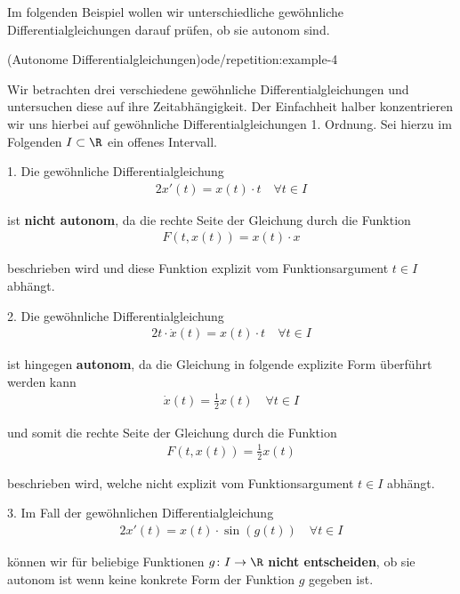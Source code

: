 \documentclass[letterpaper,10pt,english]{jupyterBook}
\begin{document}
\par
Im folgenden Beispiel wollen wir unterschiedliche gewöhnliche Differentialgleichungen darauf prüfen, ob sie autonom sind.
\begin{example}{(Autonome Differentialgleichungen)}{ode/repetition:example-4}



\par
Wir betrachten drei verschiedene gewöhnliche Differentialgleichungen und untersuchen diese auf ihre Zeitabhängigkeit.
Der Einfachheit halber konzentrieren wir uns hierbei auf gewöhnliche Differentialgleichungen 1. Ordnung.
Sei hierzu  im Folgenden \(I \subset \R\) ein offenes Intervall.

\par
1. Die gewöhnliche Differentialgleichung
\begin{align*}
2x'(t) = x(t)\cdot t \quad \forall t \in I
\end{align*}
\par
ist \textbf{nicht autonom}, da die rechte Seite der Gleichung durch die Funktion
\begin{align*}
F(t,x(t)) = x(t) \cdot x
\end{align*}
\par
beschrieben wird und diese Funktion explizit vom Funktionsargument \(t \in I\) abhängt.



\par
2. Die gewöhnliche Differentialgleichung
\begin{align*}
2t\cdot \dot{x}(t) = x(t)\cdot t \quad \forall t \in I
\end{align*}
\par
ist hingegen \textbf{autonom}, da die Gleichung in folgende explizite Form überführt werden kann
\begin{align*}
\dot{x}(t) = \frac{1}{2} x(t) \quad \forall t \in I
\end{align*}
\par
und somit die rechte Seite der Gleichung durch die Funktion
\begin{align*}
F(t,x(t)) = \frac{1}{2}x(t)
\end{align*}
\par
beschrieben wird, welche nicht explizit vom Funktionsargument \(t \in I\) abhängt.



\par
3. Im Fall der gewöhnlichen Differentialgleichung
\begin{align*}
2x'(t) = x(t)\cdot \sin(g(t)) \quad \forall t \in I
\end{align*}
\par
können wir für beliebige Funktionen \(g \colon I \rightarrow \R\) \textbf{nicht entscheiden}, ob sie autonom ist wenn keine konkrete Form der Funktion \(g\) gegeben ist.
\end{example}
\end{document}
